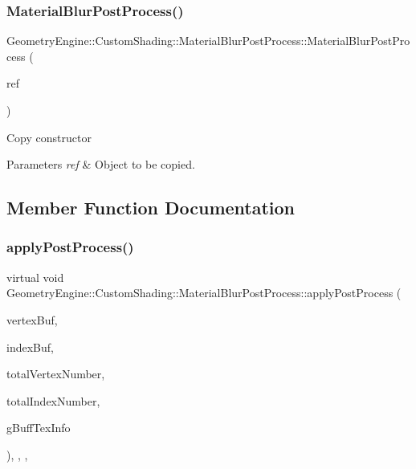\subsubsection{\texorpdfstring{MaterialBlurPostProcess()}{MaterialBlurPostProcess()}\hspace{0.1cm}{\footnotesize\ttfamily [2/2]}}
{\footnotesize\ttfamily Geometry\+Engine\+::\+Custom\+Shading\+::\+Material\+Blur\+Post\+Process\+::\+Material\+Blur\+Post\+Process (\begin{DoxyParamCaption}\item[{const \mbox{\hyperlink{class_geometry_engine_1_1_custom_shading_1_1_material_blur_post_process}{Material\+Blur\+Post\+Process}} \&}]{ref }\end{DoxyParamCaption})\hspace{0.3cm}{\ttfamily [inline]}}

Copy constructor 
\begin{DoxyParams}{Parameters}
{\em ref} & Object to be copied. \\
\hline
\end{DoxyParams}


\subsection{Member Function Documentation}
\mbox{\label{class_geometry_engine_1_1_custom_shading_1_1_material_blur_post_process_a5a6c1101b5ea4b96601db86ea36059de}} 
\subsubsection{\texorpdfstring{applyPostProcess()}{applyPostProcess()}}
{\footnotesize\ttfamily virtual void Geometry\+Engine\+::\+Custom\+Shading\+::\+Material\+Blur\+Post\+Process\+::apply\+Post\+Process (\begin{DoxyParamCaption}\item[{Q\+Open\+G\+L\+Buffer $\ast$}]{vertex\+Buf,  }\item[{Q\+Open\+G\+L\+Buffer $\ast$}]{index\+Buf,  }\item[{unsigned int}]{total\+Vertex\+Number,  }\item[{unsigned int}]{total\+Index\+Number,  }\item[{const \mbox{\hyperlink{class_geometry_engine_1_1_g_buffer_texture_info}{G\+Buffer\+Texture\+Info}} \&}]{g\+Buff\+Tex\+Info }\end{DoxyParamCaption})\hspace{0.3cm}{\ttfamily [inline]}, {\ttfamily [override]}, {\ttfamily [protected]}, {\ttfamily [virtual]}}

